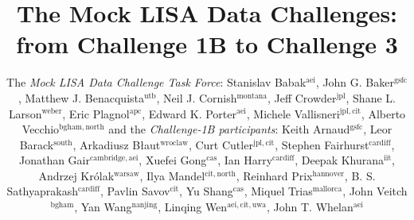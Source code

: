 \documentclass{iopart}
\begin{document}
\title{The Mock LISA Data Challenges: from Challenge 1B to Challenge 3}

\author{The \emph{Mock LISA Data Challenge Task Force}:
Stanislav Babak$^\mathrm{aei}$,
John G. Baker$^\mathrm{gsfc}$,
Matthew J. Benacquista$^\mathrm{utb}$,
Neil J. Cornish$^\mathrm{montana}$,
Jeff Crowder$^\mathrm{jpl}$,
Shane L. Larson$^\mathrm{weber}$,
Eric Plagnol$^\mathrm{apc}$,
Edward K. Porter$^\mathrm{aei}$,
Michele Vallisneri$^\mathrm{jpl,cit}$,
Alberto Vecchio$^\mathrm{bgham,north}$
and the \emph{Challenge-1B participants}:
Keith Arnaud$^\mathrm{gsfc}$,
Leor Barack$^\mathrm{south}$,
Arkadiusz B{\l}aut$^\mathrm{wroclaw}$,
Curt Cutler$^\mathrm{jpl,cit}$,
Stephen Fairhurst$^\mathrm{cardiff}$,
Jonathan Gair$^\mathrm{cambridge,aei}$,
Xuefei Gong$^\mathrm{cas}$,
Ian Harry$^\mathrm{cardiff}$,
Deepak Khurana$^\mathrm{iit}$,
Andrzej Kr\'olak$^\mathrm{warsaw}$,
Ilya Mandel$^\mathrm{cit,north}$,
Reinhard Prix$^\mathrm{hannover}$,
B. S. Sathyaprakash$^\mathrm{cardiff}$,
Pavlin Savov$^\mathrm{cit}$,
Yu Shang$^\mathrm{cas}$,
Miquel Trias$^\mathrm{mallorca}$,
John Veitch$^\mathrm{bgham}$,
Yan Wang$^\mathrm{nanjing}$,
Linqing Wen$^\mathrm{aei,cit,uwa}$,
John T. Whelan$^\mathrm{aei}$}
\end{document}
